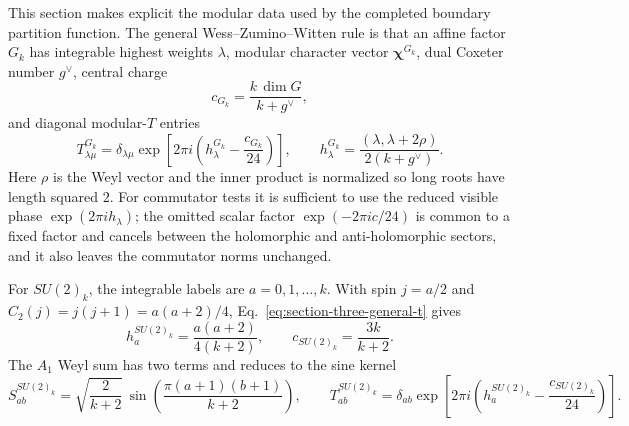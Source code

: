 \documentclass[11pt,letterpaper]{article}
\theoremstyle{plain}
\DeclareMathOperator{\dimop}{dim}
\begin{document}
This section makes explicit the modular data used by the completed boundary
partition function.  The general Wess--Zumino--Witten rule is that an affine
factor $G_k$ has integrable highest weights $\lambda$, modular character vector
$\boldsymbol\chi^{G_k}$, dual Coxeter number $g^{\vee}$, central charge
\begin{equation}
\label{eq:section-three-general-central-charge}
 c_{G_k}=\frac{k\,\dimop G}{k+g^{\vee}},
\end{equation}
and diagonal modular-$T$ entries
\begin{equation}
\label{eq:section-three-general-t}
 T^{G_k}_{\lambda\mu}
 =
 \delta_{\lambda\mu}
 \exp\!\left[2\pi i\left(h_{\lambda}^{G_k}-\frac{c_{G_k}}{24}\right)\right],
 \qquad
 h_{\lambda}^{G_k}
 =
 \frac{(\lambda,\lambda+2\rho)}{2(k+g^{\vee})}.
\end{equation}
Here $\rho$ is the Weyl vector and the inner product is normalized so long
roots have length squared $2$.  For commutator tests it is sufficient to use
the reduced visible phase $\exp(2\pi i h_{\lambda})$; the omitted scalar
factor $\exp(-2\pi i c/24)$ is common to a fixed factor and cancels between the
holomorphic and anti-holomorphic sectors, and it also leaves the commutator
norms unchanged.

For $SU(2)_k$, the integrable labels are $a=0,1,\ldots,k$.  With spin
$j=a/2$ and $C_2(j)=j(j+1)=a(a+2)/4$, Eq.~\eqref{eq:section-three-general-t}
gives
\begin{equation}
\label{eq:section-three-su2-weight}
 h^{SU(2)_k}_{a}
 =
 \frac{a(a+2)}{4(k+2)},
 \qquad
 c_{SU(2)_k}=\frac{3k}{k+2}.
\end{equation}
The $A_1$ Weyl sum has two terms and reduces to the sine kernel
\begin{equation}
\label{eq:section-three-su2-s}
 S^{SU(2)_k}_{ab}
 =
 \sqrt{\frac{2}{k+2}}\,
 \sin\!\left(\frac{\pi(a+1)(b+1)}{k+2}\right),
 \qquad
 T^{SU(2)_k}_{ab}
 =
 \delta_{ab}\exp\!\left[2\pi i\left(h^{SU(2)_k}_{a}
 -\frac{c_{SU(2)_k}}{24}\right)\right].
\end{equation}
\end{document}
